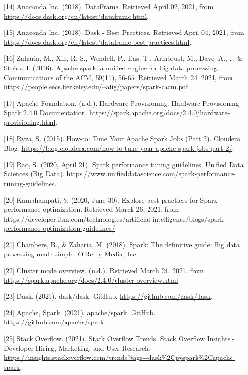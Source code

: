 \documentclass[11pt, oneside]{book}
\begin{document}
\begin{thebibliography}{111}
[14] Anaconda Inc. (2018). DataFrame. Retrieved April 02, 2021, from \url{https://docs.dask.org/en/latest/dataframe.html}.

[15] Anaconda Inc. (2018). Dask - Best Practices. Retrieved April 04, 2021, from \url{https://docs.dask.org/en/latest/dataframe-best-practices.html}.

[16] Zaharia, M., Xin, R. S., Wendell, P., Das, T., Armbrust, M., Dave, A., ... \& Stoica, I. (2016). Apache spark: a unified engine for big data processing. Communications of the ACM, 59(11), 56-65. Retrieved March 24, 2021, from \url{https://people.eecs.berkeley.edu/~alig/papers/spark-cacm.pdf}.

[17] Apache Foundation. (n.d.). Hardware Provisioning. Hardware Provisioning - Spark 2.4.0 Documentation. \url{https://spark.apache.org/docs/2.4.0/hardware-provisioning.html}.

[18] Ryza, S. (2015). How-to: Tune Your Apache Spark Jobs (Part 2). Cloudera Blog. \url{https://blog.cloudera.com/how-to-tune-your-apache-spark-jobs-part-2/}. 

[19] Rao, S. (2020, April 21). Spark performance tuning guidelines. Unified Data Sciences (Big Data). \url{https://www.unifieddatascience.com/spark-performance-tuning-guidelines}. 

[20] Kambhampati, S. (2020, June 30). Explore best practices for Spark performance optimization. Retrieved March 26, 2021, from \url{https://developer.ibm.com/technologies/artificial-intelligence/blogs/spark-performance-optimization-guidelines/}

[21] Chambers, B., \& Zaharia, M. (2018). Spark: The definitive guide: Big data processing made simple. O'Reilly Media, Inc.

[22] Cluster mode overview. (n.d.). Retrieved March 24, 2021, from \url{https://spark.apache.org/docs/2.4.0/cluster-overview.html}


[23] Dask. (2021). dask/dask. GitHub. \url{https://github.com/dask/dask}.

[24] Apache, Spark. (2021). apache/spark. GitHub. \url{https://github.com/apache/spark}.

[25] Stack Overflow. (2021). Stack Overflow Trends. Stack Overflow Insights - Developer Hiring, Marketing, and User Research. \url{https://insights.stackoverflow.com/trends?tags=dask\%2Cpyspark\%2Capache-spark}.   


\end{thebibliography}
\end{document}
